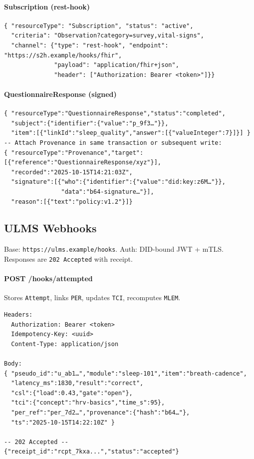 \documentclass[11pt]{article}
\theoremstyle{plain}
\begin{document}
\paragraph{Subscription (rest-hook)}
\begin{verbatim}
{ "resourceType": "Subscription", "status": "active",
  "criteria": "Observation?category=survey,vital-signs",
  "channel": {"type": "rest-hook", "endpoint": "https://s2h.example/hooks/fhir",
              "payload": "application/fhir+json",
              "header": ["Authorization: Bearer <token>"]}}
\end{verbatim}

\paragraph{QuestionnaireResponse (signed)}
\begin{verbatim}
{ "resourceType":"QuestionnaireResponse","status":"completed",
  "subject":{"identifier":{"value":"p_9f3…"}},
  "item":[{"linkId":"sleep_quality","answer":[{"valueInteger":7}]}] }
-- Attach Provenance in same transaction or subsequent write:
{ "resourceType":"Provenance","target":[{"reference":"QuestionnaireResponse/xyz"}],
  "recorded":"2025-10-15T14:21:03Z",
  "signature":[{"who":{"identifier":{"value":"did:key:z6M…"}},
                "data":"b64-signature…"}],
  "reason":[{"text":"policy:v1.2"}]}
\end{verbatim}

\subsection{ULMS Webhooks}
Base: \texttt{https://ulms.example/hooks}. Auth: DID-bound JWT + mTLS. Responses are \texttt{202 Accepted} with receipt.

\paragraph{POST /hooks/attempted}
Stores \texttt{Attempt}, links \texttt{PER}, updates \texttt{TCI}, recomputes \texttt{MLEM}.
\begin{verbatim}
Headers:
  Authorization: Bearer <token>
  Idempotency-Key: <uuid>
  Content-Type: application/json

Body:
{ "pseudo_id":"u_ab1…","module":"sleep-101","item":"breath-cadence",
  "latency_ms":1830,"result":"correct",
  "csl":{"load":0.43,"gate":"open"},
  "tci":{"concept":"hrv-basics","time_s":95},
  "per_ref":"per_7d2…","provenance":{"hash":"b64…"},
  "ts":"2025-10-15T14:22:10Z" }

-- 202 Accepted --
{"receipt_id":"rcpt_7kxa...","status":"accepted"}
\end{verbatim}
\end{document}
